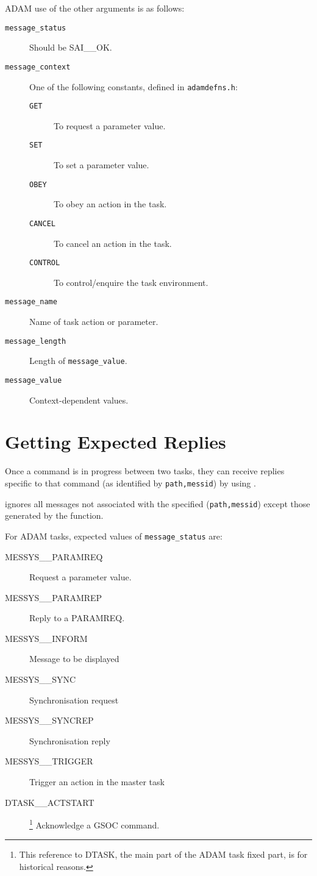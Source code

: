\documentclass[twoside,11pt,nolof]{starlink}
\begin{document}
ADAM use of the other arguments is as follows:
\begin{description}
\item[\texttt{message\_status}] Should be SAI\_\_OK.
\item[\texttt{message\_context}] One of the following constants, defined in
\texttt{adamdefns.h}:
\begin{description}
\item[\texttt{GET}] To request a parameter value.
\item[\texttt{SET}] To set a parameter value.
\item[\texttt{OBEY}] To obey an action in the task.
\item[\texttt{CANCEL}] To cancel an action in the task.
\item[\texttt{CONTROL}] To control/enquire the task environment.
\end{description}
\item[\texttt{message\_name}] Name of task action or parameter.
\item[\texttt{message\_length}] Length of \texttt{message\_value}.
\item[\texttt{message\_value}] Context-dependent values.
\end{description}

\section{\label{getting_expected_replies}Getting Expected Replies}
Once a command is in progress between two tasks, they can receive replies
specific to that command (as identified by \texttt{path,messid}) by using
.

ignores all messages not associated with the specified
(\texttt{path,messid}) except those generated by the
function.

For ADAM tasks, expected values of \texttt{message\_status} are:
\begin{small}
\begin{description}
\item[MESSYS\_\_PARAMREQ] Request a parameter value.
\item[MESSYS\_\_PARAMREP] Reply to a PARAMREQ.
\item[MESSYS\_\_INFORM] Message to be displayed
\item[MESSYS\_\_SYNC] Synchronisation request
\item[MESSYS\_\_SYNCREP] Synchronisation reply
\item[MESSYS\_\_TRIGGER] Trigger an action in the master task
\item[DTASK\_\_ACTSTART]\footnote{This reference to DTASK, the main part of the
ADAM task fixed part, is for historical reasons.} Acknowledge a GSOC command.
\end{description}
\end{small}
\end{document}
